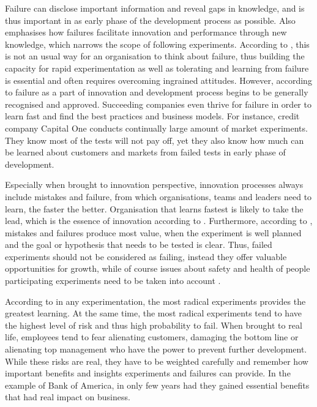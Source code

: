 Failure can disclose important information and reveal gaps in knowledge, and is thus important in as early phase of the development process as possible. \citep{buijs2007innovation,thomke2001enlightened} Also \citet{sitkin1992learning} emphasises how failures facilitate innovation and performance through new knowledge, which narrows the scope of following experiments. According to \citet{thomke2001enlightened}, this is not an usual way for an organisation to think about failure, thus building the capacity for rapid experimentation as well as tolerating and learning from failure is essential and often requires overcoming ingrained attitudes. However, according to \citet{farson2002failuretolerantleader} failure as a part of innovation and development process begins to be generally recognised and approved. Succeeding companies even thrive for failure in order to learn fast and find the best practices and business models. For instance, credit company Capital One conducts continually large amount of market experiments. They know most of the tests will not pay off, yet they also know how much can be learned about customers and markets from failed tests in early phase of development. \citep{farson2002failuretolerantleader}

Especially when brought to innovation perspective, innovation processes always include mistakes and failure, from which organisations, teams and leaders need to learn, the faster the better. Organisation that learns fastest is likely to take the lead, which is the essence of innovation according to \citet{buijs2007innovation}. Furthermore, according to \citet{thomke2001enlightened}, mistakes and failures produce most value, when the experiment is well planned and the goal or hypothesis that needs to be tested is clear. Thus, failed experiments should not be considered as failing, instead they offer valuable opportunities for growth, while of course issues about safety and health of people participating experiments need to be taken into account \citep{farson2002failuretolerantleader}. 

According to \citet{thomke2003} in any experimentation, the most radical experiments provides the greatest learning. At the same time, the most radical experiments tend to have the highest level of risk and thus high probability to fail. When brought to real life, employees tend to fear alienating customers, damaging the bottom line or alienating top management who have the power to prevent further development. While these risks are real, they have to be weighted carefully and remember how important benefits and insights experiments and failures can provide. In the example of Bank of America, in only few years had they gained essential benefits that had real impact on business. \citep{thomke2003}

